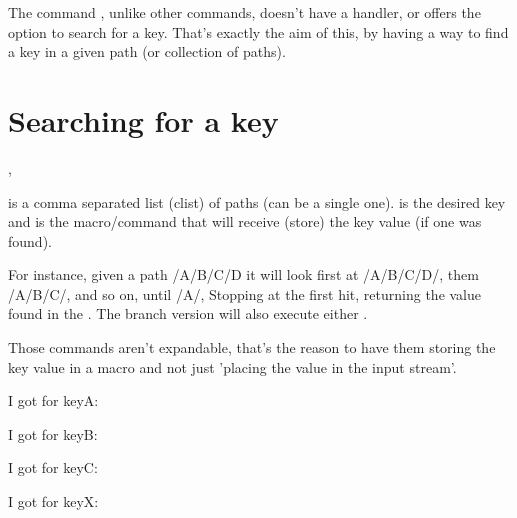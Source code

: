 \documentclass[10pt]{article}
\begin{document}
  
\begin{typesetabstract}

The command \tsobj{\pgfkeysvalueof}, unlike other \tsobj{\pgfkeys} commands, doesn't have a  handler, or offers the option to search for a key.
That's exactly the aim of this, by having a way to find a key in a given path (or collection of paths).
\end{typesetabstract}


\section{Searching for a key}
\begin{codedescribe}{\pgfkeysearchvalueof,\pgfkeysearchvalueofTF}
\begin{codesyntax}%
\end{codesyntax}
 is a comma separated list (clist) of paths (can be a single one).  is the desired key and  is the macro/command that will receive (store) the key value (if one was found).

For instance, given a path /A/B/C/D it will look first at /A/B/C/D/, them /A/B/C/, and so on, until /A/,
Stopping at the first hit, returning the value found in the .
The branch version will also execute either .
  
\end{codedescribe}
\begin{tsremark}
  Those commands aren't expandable, that's the reason to have them storing the key value in a macro and not just 'placing the value in the input stream'.
\end{tsremark}

\begin{codestore}
 
 I got for keyA: \textbf{\VALkeyA} \par
 I got for keyB: \textbf{\VALkeyB} \par
 I got for keyC: \textbf{\VALkeyC} \par
 I got for keyX: \textbf{\VALkeyX} \par
 
\end{codestore}

\end{document}
